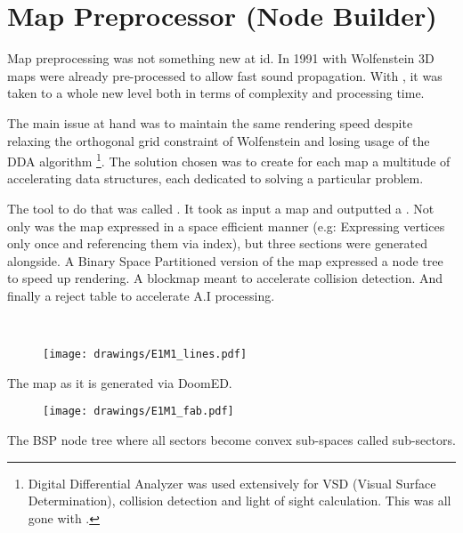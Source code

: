 \section{Map Preprocessor (Node Builder)}
Map preprocessing was not something new at id. In 1991 with Wolfenstein 3D maps were already pre-processed to allow fast sound propagation. With \doom, it was taken to a whole new level both in terms of complexity and processing time.\\
\par
The main issue at hand was to maintain the same rendering speed despite relaxing the orthogonal grid constraint of Wolfenstein and losing usage of the DDA algorithm \footnote{Digital Differential Analyzer was used extensively for VSD (Visual Surface Determination), collision detection and light of sight calculation. This was all gone with \doom.}. The solution chosen was to create for each map a multitude of accelerating data structures, each dedicated to solving a particular problem.\\
\par
 The tool to do that was called . It took as input a  map and outputted a . Not only was the map expressed in a space efficient manner (e.g: Expressing vertices only once and referencing them via index), but three sections were generated alongside. A Binary Space Partitioned version of the map expressed a node tree to speed up rendering. A blockmap meant to accelerate collision detection. And finally a reject table to accelerate A.I processing.\\
 \par
{}\\%
\par
{}
\par


%
\begin{figure}[H]
\vspace*{3mm}
\centering
\texttt{[image: drawings/E1M1\_lines.pdf]}
\end{figure}
\par
The map as it is generated via DoomED.\\
\par
\begin{figure}[H]
\vspace*{2mm}
\centering
\texttt{[image: drawings/E1M1\_fab.pdf]}
\end{figure}
The BSP node tree where all sectors become convex sub-spaces called sub-sectors.



